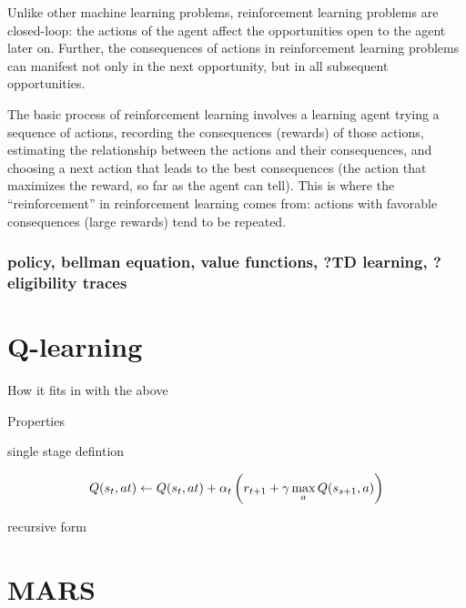 \documentclass[12pt]{article}
\begin{document}
Unlike other machine learning problems, reinforcement learning problems are closed-loop: the actions of the agent affect the opportunities open to the agent later on. Further, the consequences of actions in reinforcement learning problems can manifest not only in the next opportunity, but in all subsequent opportunities.


The basic process of reinforcement learning involves a learning agent trying a sequence of actions, recording the consequences (rewards) of those actions, estimating the relationship between the actions and their consequences, and choosing a next action that leads to the best consequences (the action that maximizes the reward, so far as the agent can tell). This is where the ``reinforcement'' in reinforcement learning comes from: actions with favorable consequences (large rewards) tend to be repeated.


\subsubsection{policy, bellman equation, value functions, ?TD learning, ?eligibility traces} %
\label{ssub:policy_bellman_equation_value_functions_td_learning_eligibility_traces}



\section{Q-learning} %
\label{sec:q_learning}

How it fits in with the above

Properties

single stage defintion

\[
Q(s_{t}, a{t}) \leftarrow Q(s_{t}, a{t}) + \alpha_{t} \del{r_{t+1} + \gamma \max_{a} Q(s_{s + 1}, a)}
\]

recursive form




\section{MARS} %
\label{sec:mars}
\end{document}
